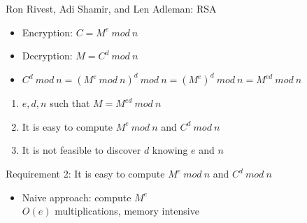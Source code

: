 \documentclass{beamer}
\begin{document}
\begin{frame}{ Ron Rivest, Adi Shamir, and Len Adleman: RSA }
  \begin{itemize}
    \item Encryption: $C = M^e\ mod\ n$
    \item Decryption: $M = C^d\ mod\ n$
    \item<2-> $ C^d\ mod\ n = (M^e\ mod\ n)^d\ mod\ n = (M^e)^d\ mod\ n = M^{ed}\ mod\ n$
  \end{itemize}
  \begin{enumerate}
    \item<3-> $e,d,n$ such that $M = M^{ed}\ mod\ n$
    \item<4-> It is easy to compute $M^e\ mod\ n$ and $C^d\ mod\ n$
    \item<5-> It is not feasible to discover $d$ knowing $e$ and $n$
  \end{enumerate}
\end{frame}

\begin{frame}[t]{Requirement 2: It is easy to compute $M^e\ mod\ n$ and $C^d\ mod\ n$}
  \begin{itemize}
  \item Naive approach: compute $M^e$ \\
    $O(e)$ multiplications, memory intensive
  \end{itemize}
\end{frame}
\end{document}
